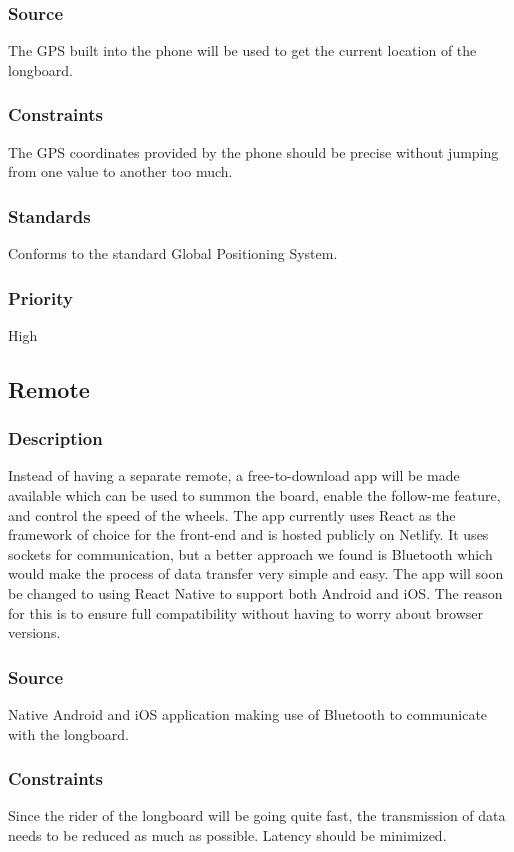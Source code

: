 \subsubsection{Source}
The GPS built into the phone will be used to get the current location of the longboard.
\subsubsection{Constraints}
The GPS coordinates provided by the phone should be precise without jumping from one value to another too much.
\subsubsection{Standards}
Conforms to the standard Global Positioning System.
\subsubsection{Priority}
High

\subsection{Remote}
\subsubsection{Description}
Instead of having a separate remote, a free-to-download app will be made available which can be used to summon the board, enable the follow-me feature, and control the speed of the wheels. The app currently uses React as the framework of choice for the front-end and is hosted publicly on Netlify. It uses sockets for communication, but a better approach we found is Bluetooth which would make the process of data transfer very simple and easy. The app  will soon be changed to using React Native to support both Android and iOS. The reason for this is to ensure full compatibility without having to worry about browser versions.
\subsubsection{Source}
Native Android and iOS application making use of Bluetooth to communicate with the longboard.
\subsubsection{Constraints}
Since the rider of the longboard will be going quite fast, the transmission of data needs to be reduced as much as possible. Latency should be minimized.
